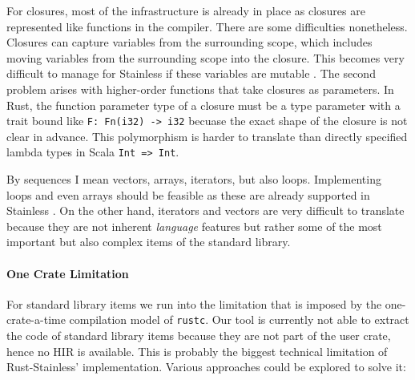 For closures, most of the infrastructure is already in place as closures are
represented like functions in the compiler. There are some difficulties
nonetheless. Closures can capture variables from the surrounding scope, which
includes moving variables from the surrounding scope into the closure. This
becomes very difficult to manage for Stainless if these variables are mutable
\cite[section 3.4.3]{regb}. The second problem arises with higher-order
functions that take closures as parameters. In Rust, the function parameter type
of a closure must be a type parameter with a trait bound like
\passthrough{\lstinline!F: Fn(i32) -> i32!} becuase the exact shape of the
closure is not clear in advance. This polymorphism is harder to translate than
directly specified lambda types in Scala \passthrough{\lstinline!Int => Int!}.

By sequences I mean vectors, arrays, iterators, but also loops. Implementing
loops and even arrays should be feasible as these are already supported in
Stainless \cite[section "Imperative"]{stainless-doc}. On the other hand,
iterators and vectors are very difficult to translate because they are not
inherent \emph{language} features but rather some of the most important but also
complex items of the standard library.


\paragraph{One Crate Limitation}

For standard library items we run into the limitation that is imposed by the
one-crate-a-time compilation model of \passthrough{\lstinline!rustc!}. Our tool
is currently not able to extract the code of standard library items because they
are not part of the user crate, hence no HIR is available. This is probably the
biggest technical limitation of Rust-Stainless' implementation. Various
approaches could be explored to solve it:

